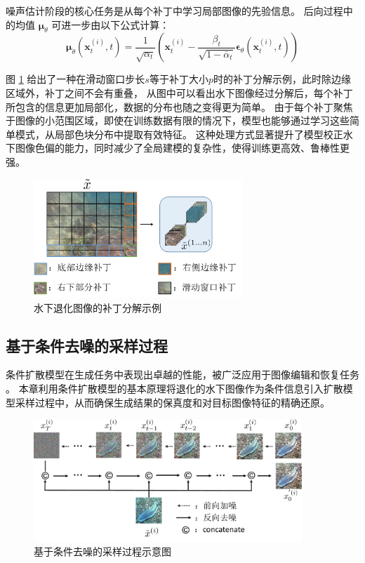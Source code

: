 噪声估计阶段的核心任务是从每个补丁中学习局部图像的先验信息。
后向过程中的均值 $\boldsymbol{\mu}_\theta$ 可进一步由以下公式计算：
\begin{equation}
    \boldsymbol{\mu}_\theta\left(\mathbf{x}^{(i)}_t, t\right)=\frac{1}{\sqrt{\alpha_t}}\left(\mathbf{x}^{(i)}_t-\frac{\beta_t}{\sqrt{1-\bar{\alpha}_t}} \boldsymbol{\epsilon}_\theta\left(\mathbf{x}^{(i)}_t, t\right)\right)
\end{equation}

图 \ref{img:patch} 给出了一种在滑动窗口步长$s$等于补丁大小$p$时的补丁分解示例，此时除边缘区域外，补丁之间不会有重叠，
从图中可以看出水下图像经过分解后，每个补丁所包含的信息更加局部化，数据的分布也随之变得更为简单。
由于每个补丁聚焦于图像的小范围区域，即使在训练数据有限的情况下，模型也能够通过学习这些简单模式，从局部色块分布中提取有效特征。
这种处理方式显著提升了模型校正水下图像色偏的能力，同时减少了全局建模的复杂性，使得训练更高效、鲁棒性更强。
\begin{figure}
    \centering
    \includegraphics[width=0.7\textwidth]{figures/ch3/patch.pdf}
    \caption{水下退化图像的补丁分解示例}
    \label{img:patch}
\end{figure}


\subsection{基于条件去噪的采样过程}

条件扩散模型在生成任务中表现出卓越的性能，被广泛应用于图像编辑和恢复任务\cite{cDDPM} \cite{rst_DDPM}。
本章利用条件扩散模型的基本原理将退化的水下图像作为条件信息引入扩散模型采样过程中，从而确保生成结果的保真度和对目标图像特征的精确还原。
\begin{figure}
    \centering
    \includegraphics[width=0.9\textwidth]{figures/ch3/cond_ddpm.pdf}
    \caption{基于条件去噪的采样过程示意图}
    \label{img:cond_ddpm}
\end{figure}

